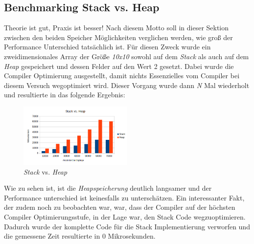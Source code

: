 \subsection{Benchmarking Stack vs. Heap}
Theorie ist gut, Praxis ist besser! Nach diesem Motto soll in dieser Sektion zwischen den beiden
Speicher Möglichkeiten verglichen werden, wie groß der Performance Unterschied tatsächlich ist.
Für diesen Zweck wurde ein zweidimensionales Array der Größe \emph{10x10} sowohl auf dem
\emph{Stack} als auch auf dem \emph{Heap} gespeichert und dessen Felder auf den Wert 2 gesetzt.
Dabei wurde die Compiler Optimierung ausgestellt, damit nichts Essenzielles vom Compiler bei
diesem Versuch wegoptimiert wird. Dieser Vorgang wurde dann \emph{N} Mal wiederholt und
resultierte in das folgende Ergebnis:

\begin{figure}[h]
    \centering
    \includegraphics[width=0.5\textwidth]{bilder/StackvsHeap}
    \caption[StackvsHeap]{\emph{Stack} vs. \emph{Heap}}
    \label{img:StackvsHeap}
\end{figure}

Wie zu sehen ist, ist die \emph{Heapspeicherung} deutlich langsamer und der Performance
unterschied ist keinesfalls zu unterschätzen.
\newline
\newline
Ein interessanter Fakt, der zudem noch zu beobachten war, war, dass der Compiler auf der höchsten
Compiler Optimierungsstufe, in der Lage war, den Stack Code wegzuoptimieren. Dadurch wurde der
komplette Code für die Stack Implementierung verworfen und die gemessene Zeit resultierte in 0
Mikrosekunden.

